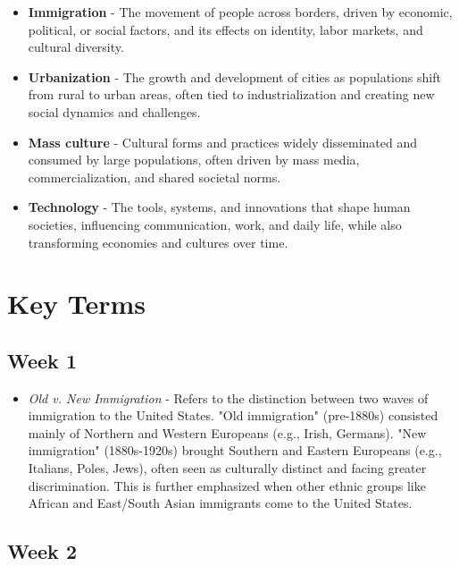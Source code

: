 \documentclass[12pt]{article}
\begin{document}
\begin{itemize}
    \item{\textbf{Immigration}} - The movement of people across borders, driven by economic, political, or social factors, and its effects on identity, labor markets, and cultural diversity.
    \item{\textbf{Urbanization}} - The growth and development of cities as populations shift from rural to urban areas, often tied to industrialization and creating new social dynamics and challenges.
    \item{\textbf{Mass culture}} - Cultural forms and practices widely disseminated and consumed by large populations, often driven by mass media, commercialization, and shared societal norms.
    \item{\textbf{Technology}} - The tools, systems, and innovations that shape human societies, influencing communication, work, and daily life, while also transforming economies and cultures over time.
\end{itemize}

\section*{Key Terms}

\subsection*{Week 1}

\begin{itemize}
    \item \textit{Old v. New Immigration} - Refers to the distinction between two waves of immigration to the United States. "Old immigration" (pre-1880s) consisted mainly of Northern and Western Europeans (e.g., Irish, Germans). "New immigration" (1880s-1920s) brought Southern and Eastern Europeans (e.g., Italians, Poles, Jews), often seen as culturally distinct and facing greater discrimination. This is further emphasized when other ethnic groups like African and East/South Asian immigrants come to the United States.
\end{itemize}

\subsection*{Week 2}
\end{document}
